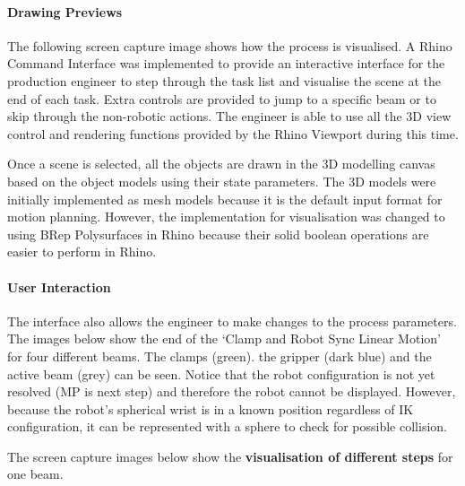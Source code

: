 \paragraph{Drawing Previews}

The following screen capture image shows how the process is visualised. A Rhino Command Interface was implemented to provide an interactive interface for the production engineer to step through the task list and visualise the scene at the end of each task. Extra controls are provided to jump to a specific beam or to skip through the non-robotic actions. The engineer is able to use all the 3D view control and rendering functions provided by the Rhino Viewport during this time.

Once a scene is selected, all the objects are drawn in the 3D modelling canvas based on the object models using their state parameters. The 3D models were initially implemented as mesh models because it is the default input format for motion planning. However, the implementation for visualisation was changed to using BRep Polysurfaces in Rhino because their solid boolean operations are easier to perform in Rhino. 




\paragraph{User Interaction}

The interface also allows the engineer to make changes to the process parameters. The images below show the end of the ‘Clamp and Robot Sync Linear Motion’ for four different beams. The clamps (green). the gripper (dark blue) and the active beam (grey) can be seen. Notice that the robot configuration is not yet resolved (MP is next step) and therefore the robot cannot be displayed. However, because the robot’s spherical wrist is in a known position regardless of IK configuration, it can be represented with a sphere to check for possible collision.



The screen capture images below show the \textbf{visualisation of different steps }for one beam. 

